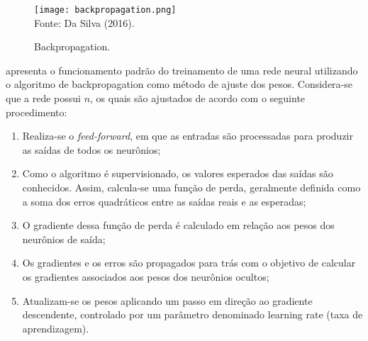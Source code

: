         \begin{figure}[!htb]
            \centering
            \caption{Backpropagation.}
            \texttt{[image: backpropagation.png]}\\
            {\footnotesize Fonte: Da Silva (2016).}\
            \label{fig:fluxo-backpropagation}
        \end{figure}
         apresenta o funcionamento padrão do treinamento de uma rede neural utilizando o algoritmo 
        de backpropagation como método de ajuste dos pesos. Considera-se que a rede possui \( n\),  os quais são 
        ajustados de acordo com o seguinte procedimento:
        \begin{enumerate}
            \item Realiza-se o \emph{feed-forward}, em que as entradas são processadas para produzir as saídas de todos os neurônios;
            \item Como o algoritmo é supervisionado, os valores esperados das saídas são conhecidos. Assim, calcula-se uma função de perda, geralmente definida como a soma dos erros quadráticos entre as saídas reais e as esperadas;
            \item O gradiente dessa função de perda é calculado em relação aos pesos dos neurônios de saída;
            \item Os gradientes e os erros são propagados para trás com o objetivo de calcular os gradientes associados aos pesos dos neurônios ocultos;
            \item Atualizam-se os pesos aplicando um passo em direção ao gradiente descendente, controlado por um parâmetro denominado learning rate (taxa de aprendizagem).
        \end{enumerate}